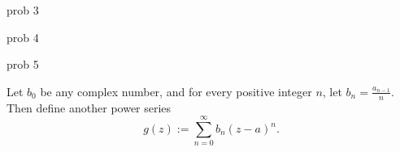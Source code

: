 \documentclass{article}
\begin{document}
\begin{prob}
    prob 3
\end{prob}

\begin{prob}
    prob 4
\end{prob}

\begin{prob}
    prob 5
\end{prob}
Let $b_0$ be any complex number, and for every positive integer $n$, let $b_n= \frac{a_{n-1}}{n}$. Then define another power series
\[ g(z) := \sum_{n=0}^\infty b_n(z-a)^n. \]
\end{document}
